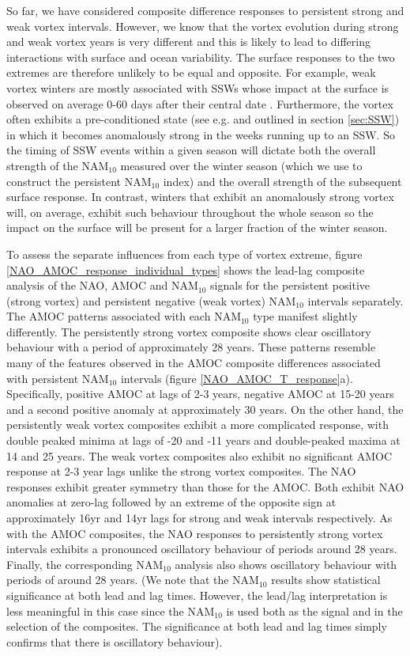 So far, we have considered composite difference responses to persistent strong and weak vortex intervals. However, we know that the vortex evolution during strong and weak vortex years is very different and this is likely to lead to differing interactions with surface and ocean variability.  The surface responses to the two extremes are therefore unlikely to be equal and opposite. For example, weak vortex winters are mostly associated with SSWs whose impact at the surface is observed on average 0-60 days after their central date \citep{baldwinStratospheric2001a}. Furthermore,  the vortex often exhibits a pre-conditioned state (see e.g. \cite{charltonNew2007a} and \cite{bancalaPreconditioning2012} outlined in section \ref{sec:SSW}) in which it becomes anomalously strong in the weeks running up to an SSW. So the timing of SSW events within a given season will dictate both the overall strength of the NAM$_{10}$ measured over the winter season (which we use to construct the persistent NAM$_{10}$ index) and the overall strength of the subsequent surface response. In contrast, winters that exhibit an anomalously strong vortex will, on average, exhibit such behaviour throughout the whole season so the impact on the surface will be present for a larger fraction of the winter season.

To assess the separate influences from each type of vortex extreme, figure \ref{NAO_AMOC_response_individual_types} shows the lead-lag composite analysis of the NAO, AMOC and NAM$_{10}$ signals for the persistent positive (strong vortex) and persistent negative (weak vortex) NAM$_{10}$ intervals separately. The AMOC patterns associated with each NAM$_{10}$ type manifest slightly differently. The persistently strong vortex composite shows clear oscillatory behaviour with a period of approximately 28 years. These patterns resemble many of the features observed in the AMOC composite differences associated with persistent NAM$_{10}$ intervals (figure \ref{NAO_AMOC_T_response}a). Specifically, positive AMOC at lags of 2-3 years, negative AMOC at 15-20 years and a second positive anomaly at approximately 30 years. On the other hand, the persistently weak vortex composites exhibit a more complicated response, with double peaked minima at lags of -20 and -11 years and double-peaked maxima at 14 and 25 years. The weak vortex composites also exhibit no significant AMOC response at 2-3 year lags unlike the strong vortex composites. The NAO responses exhibit greater symmetry than those for the AMOC. Both exhibit NAO anomalies at zero-lag followed by an extreme of the opposite sign at approximately 16yr and 14yr lags for strong and weak intervals respectively. As with the AMOC composites, the NAO responses to persistently strong vortex intervals exhibits a pronounced oscillatory behaviour of periods around 28 years. Finally, the corresponding NAM$_{10}$ analysis also shows oscillatory behaviour with periods of around 28 years. (We note that the NAM$_{10}$ results  show statistical significance  at both lead and lag times. However, the lead/lag interpretation is less meaningful in this case since the NAM$_{10}$ is used both as the signal and in the selection of the composites. The significance at both lead and lag times simply confirms that there is oscillatory behaviour). 

